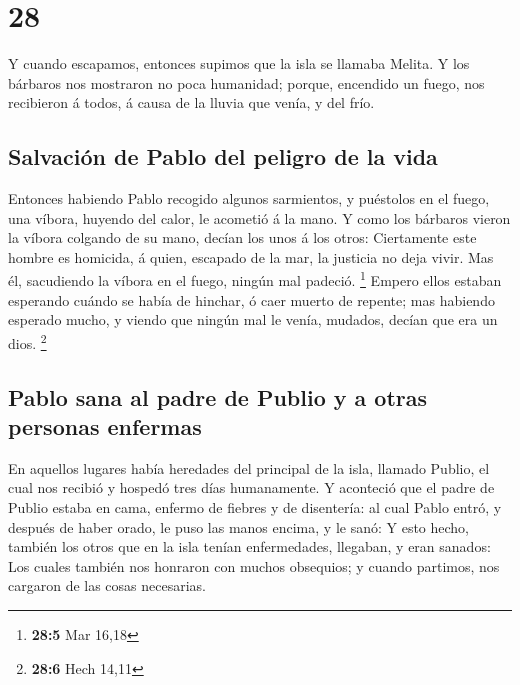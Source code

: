 \hypertarget{section-27}{%
\section{28}\label{section-27}}

 Y cuando escapamos, entonces supimos que la isla se llamaba
Melita.  Y los bárbaros nos mostraron no poca humanidad;
porque, encendido un fuego, nos recibieron á todos, á causa de la lluvia
que venía, y del frío.

\hypertarget{salvaciuxf3n-de-pablo-del-peligro-de-la-vida}{%
\subsection{Salvación de Pablo del peligro de la
vida}\label{salvaciuxf3n-de-pablo-del-peligro-de-la-vida}}

 Entonces habiendo Pablo recogido algunos sarmientos, y
puéstolos en el fuego, una víbora, huyendo del calor, le acometió á la
mano.  Y como los bárbaros vieron la víbora colgando de su
mano, decían los unos á los otros: Ciertamente este hombre es homicida,
á quien, escapado de la mar, la justicia no deja vivir.  Mas
él, sacudiendo la víbora en el fuego, ningún mal padeció. \footnote{\textbf{28:5}
  Mar 16,18}  Empero ellos estaban esperando cuándo se había
de hinchar, ó caer muerto de repente; mas habiendo esperado mucho, y
viendo que ningún mal le venía, mudados, decían que era un dios.
\footnote{\textbf{28:6} Hech 14,11}

\hypertarget{pablo-sana-al-padre-de-publio-y-a-otras-personas-enfermas}{%
\subsection{Pablo sana al padre de Publio y a otras personas
enfermas}\label{pablo-sana-al-padre-de-publio-y-a-otras-personas-enfermas}}

 En aquellos lugares había heredades del principal de la
isla, llamado Publio, el cual nos recibió y hospedó tres días
humanamente.  Y aconteció que el padre de Publio estaba en
cama, enfermo de fiebres y de disentería: al cual Pablo entró, y después
de haber orado, le puso las manos encima, y le sanó:  Y esto
hecho, también los otros que en la isla tenían enfermedades, llegaban, y
eran sanados:  Los cuales también nos honraron con muchos
obsequios; y cuando partimos, nos cargaron de las cosas necesarias.

